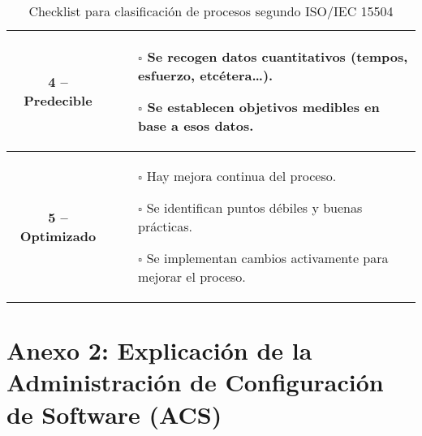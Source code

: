 \begin{table}[H]
\begin{tabular}{|c|p{12cm}|}
        \textbf{4 – Predecible} &
        \begin{itemize}
            \item[$\square$] Se recogen datos cuantitativos (tempos, esfuerzo, etcétera\ldots).
            \item[$\square$] Se establecen objetivos medibles en base a esos datos.
        \end{itemize} \\ \hline

        \textbf{5 – Optimizado} &
        \begin{itemize}
            \item[$\square$] Hay mejora continua del proceso.
            \item[$\square$] Se identifican puntos débiles y buenas prácticas.
            \item[$\square$] Se implementan cambios activamente para mejorar el proceso.
        \end{itemize} \\ \hline

    \end{tabular}
    \caption{Checklist para clasificación de procesos segundo ISO/IEC 15504}\label{tab:IEC15504_checklist}
\end{table}

\clearpage

\section*{Anexo 2: Explicación de la Administración de Configuración de Software (ACS)}

